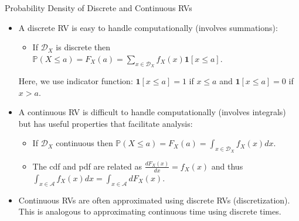\documentclass[handout,9pt]{beamer}
\begin{document}
%
\begin{frame}{Probability Density of Discrete and Continuous RVs}

\begin{itemize}
\item A discrete RV is easy to handle computationally  (involves summations):
\vspace{0.1in}
\begin{itemize}
 \setlength{\itemsep}{5pt}
\item If $\mathcal{D}_X$ is discrete then $\mathbb{P}(X\leq a)=F_X(a)=\sum_{x\in \mathcal{D}_X}f_X(x)\mathbf{1}[x\leq a]$. 
\end{itemize}
\vspace{0.1in}
Here, we use  indicator  function: $\mathbf{1}[x\leq a]=1$ if $x\leq a$ and $\mathbf{1}[x\leq a]=0$ if $x> a$. 
\vspace{0.1in}
\item A continuous RV is difficult to handle computationally (involves integrals) but has useful properties that facilitate analysis:
\vspace{0.1in}
\begin{itemize}
 \setlength{\itemsep}{5pt}
\item If $\mathcal{D}_X$ continuous then $\mathbb{P}(X\leq a)=F_X(a)=\int_{x\in \mathcal{D}_X}f_X(x)dx$. 
\item The cdf and pdf are related as $\frac{dF_X(x)}{dx}=f_X(x)$ and thus $\int_{x\in \mathcal{A}}f_X(x)dx=\int_{x\in \mathcal{A}}dF_X(x)$.
\end{itemize}
\vspace{0.1in}
\item Continuous RVs are often approximated using discrete RVs (discretization). This is analogous to approximating continuous time using discrete times. 

\end{itemize}


\end{frame}
\end{document}
